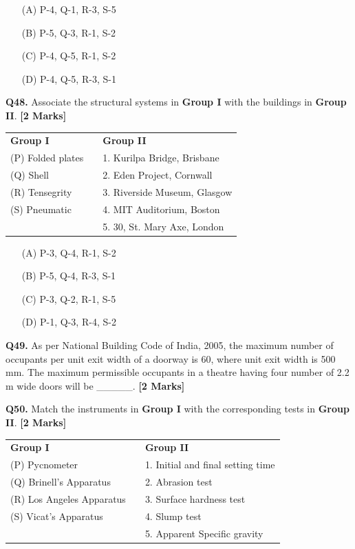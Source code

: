 \documentclass[11pt]{article}
\newcommand{\questionb}[2]{
    \noindent\textbf{Q#2.} #1 \hfill \textbf{[2 Marks]}
}
\begin{document}
\begin{enumerate}
    \item[(A)] P-4, Q-1, R-3, S-5
    \item[(B)] P-5, Q-3, R-1, S-2  
    \item[(C)] P-4, Q-5, R-1, S-2
    \item[(D)] P-4, Q-5, R-3, S-1
\end{enumerate}

\vspace{0.5cm}

\questionb{Associate the structural systems in \textbf{Group I} with the buildings in \textbf{Group II}.}{48}

\begin{tabularx}{\linewidth}{lXl}
\textbf{Group I} & & \textbf{Group II} \\
(P) Folded plates & & 1. Kurilpa Bridge, Brisbane \\
(Q) Shell & & 2. Eden Project, Cornwall \\
(R) Tensegrity & & 3. Riverside Museum, Glasgow \\
(S) Pneumatic & & 4. MIT Auditorium, Boston \\
& & 5. 30, St. Mary Axe, London \\
\end{tabularx}

\begin{enumerate}
    \item[(A)] P-3, Q-4, R-1, S-2
    \item[(B)] P-5, Q-4, R-3, S-1  
    \item[(C)] P-3, Q-2, R-1, S-5
    \item[(D)] P-1, Q-3, R-4, S-2
\end{enumerate}

\vspace{0.5cm}

\questionb{As per National Building Code of India, 2005, the maximum number of occupants per unit exit width of a doorway is 60, where unit exit width is 500 mm. The maximum permissible occupants in a theatre having four number of 2.2 m wide doors will be \_\_\_\_\_.}{49}

\vspace{0.5cm}

\questionb{Match the instruments in \textbf{Group I} with the corresponding tests in \textbf{Group II}.}{50}

\begin{tabularx}{\linewidth}{lXl}
\textbf{Group I} & & \textbf{Group II} \\
(P) Pycnometer & & 1. Initial and final setting time \\
(Q) Brinell's Apparatus & & 2. Abrasion test \\
(R) Los Angeles Apparatus & & 3. Surface hardness test \\
(S) Vicat's Apparatus & & 4. Slump test \\
& & 5. Apparent Specific gravity \\
\end{tabularx}
\end{document}

